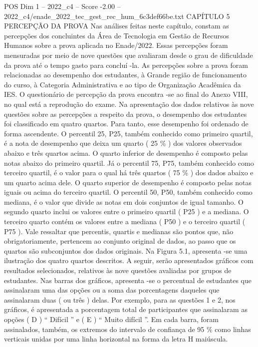 \begin{textsample}{POS Dim 1 – 2022\_c4 – Score -2.00 – 2022\_c4/enade\_2022\_tec\_gest\_rec\_hum\_6c3def66be.txt}  \label{ex:f1_pos_254}
CAPÍTULO 5 PERCEPÇÃO DA PROVA Nas análises feitas neste capítulo, constam as percepções dos concluintes da Área de Tecnologia em Gestão de Recursos Humanos sobre a prova aplicada no Enade/2022.
Essas percepções foram mensuradas por meio de nove questões que avaliaram desde o grau de dificuldade da prova até o tempo gasto para concluí -la.
As percepções sobre a prova foram relacionadas ao desempenho dos estudantes, à Grande região de funcionamento do curso, à Categoria Administrativa e ao tipo de Organização Acadêmica da IES.
O questionário de percepção da prova encontra -se ao final do Anexo VIII, no qual está a reprodução do exame.
Na apresentação dos dados relativos às nove questões sobre as percepções a respeito da prova, o desempenho dos estudantes foi classificado em quatro quartos.
Para tanto, esse desempenho foi ordenado de forma ascendente.
O percentil 25, P25, também conhecido como primeiro quartil, é a nota de desempenho que deixa um quarto ( 25 \% ) dos valores observados abaixo e três quartos acima.
O quarto inferior de desempenho é composto pelas notas abaixo do primeiro quartil.
Já o percentil 75, P75, também conhecido como terceiro quartil, é o valor para o qual há três quartos ( 75 \% ) dos dados abaixo e um quarto acima dele.
O quarto superior de desempenho é composto pelas notas iguais ou acima do terceiro quartil.
O percentil 50, P50, também conhecido como mediana, é o valor que divide as notas em dois conjuntos de igual tamanho.
O segundo quarto inclui os valores entre o primeiro quartil ( P25 ) e a mediana.
O terceiro quarto contém os valores entre a mediana ( P50 ) e o terceiro quartil ( P75 ).
Vale ressaltar que percentis, quartis e medianas são pontos que, não obrigatoriamente, pertencem ao conjunto original de dados, ao passo que os quartos são subconjuntos dos dados originais.
Na Figura 5.1, apresenta -se uma ilustração dos quatro quartos descritos.
A seguir, serão apresentados gráficos com resultados selecionados, relativos às nove questões avaliadas por grupos de estudantes.
Nas barras dos gráficos, apresenta -se o percentual de estudantes que assinalaram uma das opções ou a soma das porcentagens daqueles que assinalaram duas ( ou três ) delas.
Por exemplo, para as questões 1 e 2, nos gráficos, é apresentada a porcentagem total de participantes que assinalaram as opções ( D ) “ Difícil ” e ( E ) “ Muito difícil ”.
Em cada barra, foram assinalados, também, os extremos do intervalo de confiança de 95 \% como linhas verticais unidas por uma linha horizontal na forma da letra H maiúscula.

\end{textsample}
